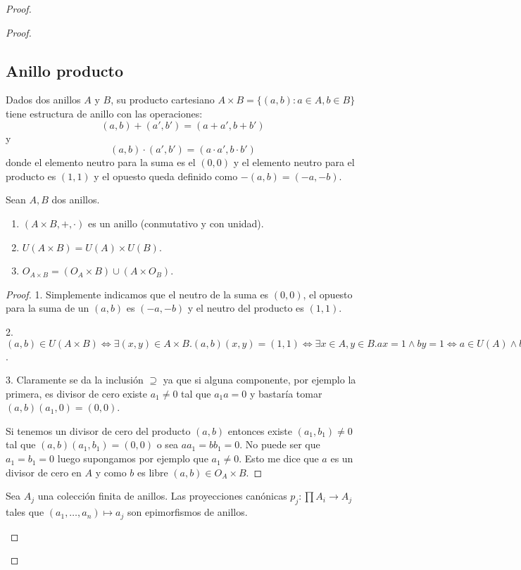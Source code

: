 \begin{proof}
\begin{proof}
\subsection{Anillo producto}

\begin{definition}
	Dados dos anillos $A$ y $B$, su producto cartesiano $A \times B = \{(a,b):a \in A,b \in B\}$ tiene estructura de anillo con las operaciones: $$(a,b)+(a',b') = (a+a',b+b')$$ y $$(a,b) \cdot (a',b') = (a \cdot a',b \cdot b')$$ donde el elemento neutro para la suma es el $(0,0)$ y el elemento neutro para el producto es $(1,1)$ y el opuesto queda definido como $-(a,b) = (-a,-b)$. 
\end{definition}

\begin{proposition}
	Sean $A,B$ dos anillos.
	
	\begin{enumerate}
	\item $(A \times B,+,\cdot)$ es un anillo (conmutativo y con unidad). 
	\item $U(A \times B) = U(A) \times U(B)$. 
	\item $O_{A \times B} = (O_A \times B) \cup (A \times O_B)$.
	\end{enumerate}
\end{proposition}
\begin{proof}
	1. Simplemente indicamos que el neutro de la suma es $(0,0)$, el opuesto para la suma de un $(a,b)$ es $(-a,-b)$ y el neutro del producto es $(1,1)$. 
	
	2. $(a,b) \in U(A \times B) \iff \exists (x,y) \in A \times B. (a,b)(x,y) = (1,1) \iff \exists x \in A, y \in B. ax = 1 \land by = 1 \iff a \in U(A) \land b \in U(B) \iff  (a,b) \in U(A) \times U(B)$.
	
	3. Claramente se da la inclusión $\supseteq$ ya que si alguna componente, por ejemplo la primera, es divisor de cero existe $a_1 \neq 0$ tal que $a_1 a = 0$ y bastaría tomar $(a,b)(a_1,0) = (0,0)$.
	
	Si tenemos un divisor de cero del producto $(a,b)$ entonces existe $(a_1,b_1) \neq 0$ tal que $(a,b)(a_1,b_1) = (0,0)$ o sea $a a_1 = b b_1 = 0$. No puede ser que $a_1 = b_1 = 0$ luego supongamos por ejemplo que $a_1 \neq 0$. Esto me dice que $a$ es un divisor de cero en $A$ y como $b$ es libre $(a,b) \in O_A \times B$. 
\end{proof}


\begin{definition}
Sea $A_j$ una colección finita de anillos. Las proyecciones canónicas $p_j:\prod A_i \to A_j$ tales que $(a_1,\ldots,a_n) \mapsto a_j$ son epimorfismos de anillos. 
\end{definition}


\end{proof}
\end{proof}
